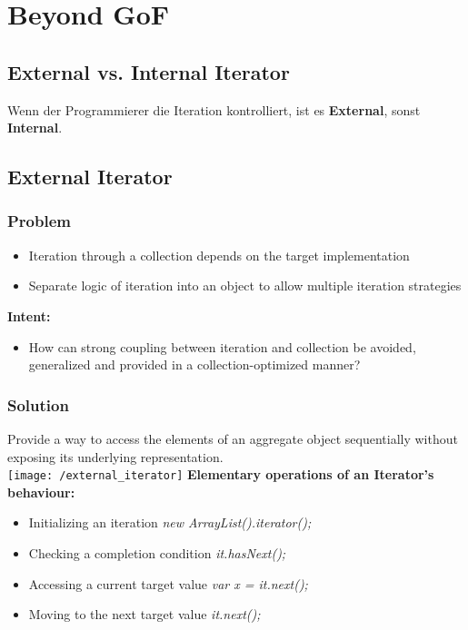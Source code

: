 
\section{Beyond GoF}
\subsection{External vs. Internal Iterator}
Wenn der Programmierer die Iteration kontrolliert, ist es \textbf{External}, sonst \textbf{Internal}.
\subsection{External Iterator}
\subsubsection{Problem}
\begin{itemize}[topsep=0pt]
    \itemsep -0.4em
    \item Iteration through a collection depends on the target implementation
    \item Separate logic of iteration into an object to allow multiple iteration strategies
\end{itemize}
\textbf{Intent:}
\begin{itemize}
    \item How can strong coupling between iteration and collection be avoided, generalized and provided in a collection-optimized manner?
\end{itemize}
\subsubsection{Solution}
Provide a way to access the elements of an aggregate object sequentially without exposing its underlying representation.\\ 
\texttt{[image: /external\_iterator]}
\textbf{Elementary operations of an Iterator's behaviour:}
\begin{itemize}[topsep=0pt]
    \itemsep -0.4em
    \item Initializing an iteration \textit{new ArrayList().iterator();}
    \item Checking a completion condition \textit{it.hasNext();}
    \item Accessing a current target value \textit{var x = it.next();}
    \item Moving to the next target value \textit{it.next();}
\end{itemize}
